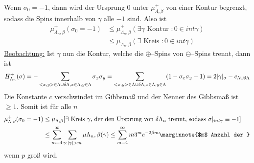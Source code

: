 \begin{beweis}
	Wenn $\sigma_0 = -1$, dann wird der Ursprung $0$ unter $\mu_{\Lambda, \beta}^{+}$ von einer Kontur begrenzt, sodass die Spins innerhalb von $\gamma$ alle $-1$ sind. Also ist 
	\begin{align}
		\mu_{\Lambda_n, \beta}^{+}(\sigma_0 = -1) &\leq \mu_{\Lambda_n, \beta}^{+} (\exists \gamma \text{ Kontur } : 0 \in int \gamma) \\
					&\leq \mu_{\Lambda_n, \beta}(\exists \text{ Kreis } : 0 \in int \gamma)
	\end{align}
	\underline{Beobachtung:} Ist $\gamma$ nun die Kontur, welche die $\oplus$--Spins von $\ominus$--Spins trennt, dann ist 
	\begin{align}
		H^+_{\Lambda_n} (\sigma) = - \sum\limits_{<x,y> \in \Lambda \cup \delta \Lambda, x \in \Lambda, y \in \Lambda} \sigma_x \sigma_y = \sum\limits_{{<x,y> \in \Lambda \cup \delta \Lambda, x \in \Lambda, y \in \Lambda}} (1- \sigma_x \sigma_y -1) = 2 \lvert\gamma\rvert_{\sigma} - c_{\Lambda \cup \delta \Lambda}
	\end{align}
	Die Konstante $c$ verschwindet im Gibbsmaß und der Nenner des Gibbsmaß ist $\geq 1$. Somit ist für alle $n$
	\begin{align}
		\mu_{\Lambda, \beta}^{+} (\sigma_0 = -1) &\leq \mu_{\Lambda, \beta} \benb{\exists \text{ Kreis $\gamma$, der den Ursprung von $\delta\Lambda_n$ trennt, sodass } \sigma|_{int \gamma } \equiv -1} \\
				&\leq \sum\limits_{m = 4}^{\infty} \sum\limits_{\gamma: \abs{\gamma} > m} \mu{\Lambda_n,\beta} (\gamma) \leq \sum\limits_{m = 4}^{\infty} m3^m e^{-2\beta m} \marginnote{$m$ Anzahl der }
	\end{align}
	wenn $p$ groß wird.
\end{beweis}

